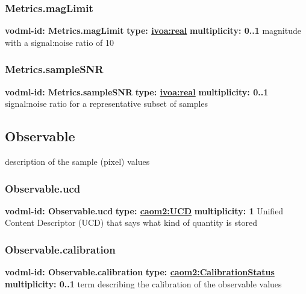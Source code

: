     \subsubsection{Metrics.magLimit}
      \textbf{vodml-id: Metrics.magLimit} \newline
      \textbf{type: \hyperref[sect:ivoa]{ivoa:real}} \newline
      \textbf{multiplicity: 0..1} \newline
      magnitude with a signal:noise ratio of 10

    \subsubsection{Metrics.sampleSNR}
      \textbf{vodml-id: Metrics.sampleSNR} \newline
      \textbf{type: \hyperref[sect:ivoa]{ivoa:real}} \newline
      \textbf{multiplicity: 0..1} \newline
      signal:noise ratio for a representative subset of samples

  \subsection{Observable}
  \label{sect:Observable}
    description of the sample (pixel) values

    \subsubsection{Observable.ucd}
      \textbf{vodml-id: Observable.ucd} \newline
      \textbf{type: \hyperref[sect:UCD]{caom2:UCD}} \newline
      \textbf{multiplicity: 1} \newline
      Unified Content Descriptor (UCD) that says what kind of quantity is stored

    \subsubsection{Observable.calibration}
      \textbf{vodml-id: Observable.calibration} \newline
      \textbf{type: \hyperref[sect:CalibrationStatus]{caom2:CalibrationStatus}} \newline
      \textbf{multiplicity: 0..1} \newline
      term describing the calibration of the observable values

